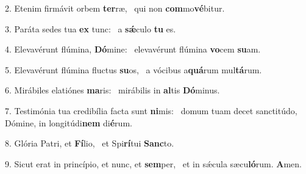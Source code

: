 2. Etenim firmávit orbem \textbf{ter}ræ, \ast\  qui non \textbf{com}mo\textbf{vé}bitur.\

3. Paráta sedes tua \textbf{ex} tunc: \ast\  a \textbf{sǽ}culo \textbf{tu} es.\

4. Elevavérunt flúmina, \textbf{Dó}mine: \ast\  elevavérunt flúmina \textbf{vo}cem \textbf{su}am.\

5. Elevavérunt flúmina fluctus \textbf{su}os, \ast\  a vócibus a\textbf{quá}rum mul\textbf{tá}rum.\

6. Mirábiles elatiónes \textbf{ma}ris: \ast\  mirábilis in \textbf{al}tis \textbf{Dó}minus.\

7. Testimónia tua credibília facta sunt \textbf{ni}mis: \ast\  domum tuam decet sanctitúdo, Dómine, in longitúdi\textbf{nem} di\textbf{é}rum.\

8. Glória Patri, et \textbf{Fí}lio, \ast\  et Spi\textbf{rí}tui \textbf{Sanc}to.\

9. Sicut erat in princípio, et nunc, et \textbf{sem}per, \ast\  et in sǽcula sæcu\textbf{ló}rum. \textbf{A}men.\

